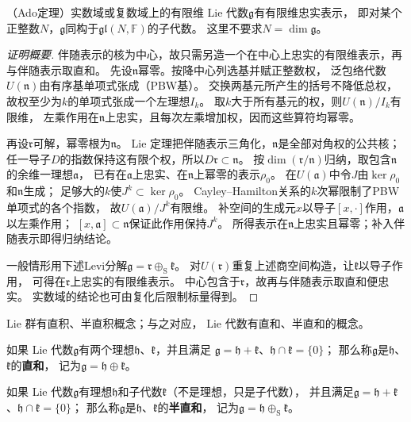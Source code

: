 \begin{theorem}
    （Ado定理）实数域或复数域上的有限维 Lie 代数$\mathfrak g$有有限维忠实表示，
    即对某个正整数$N$，$\mathfrak g$同构于$\mathfrak{gl}(N,\mathbb F)$的子代数。
    这里不要求$N=\dim\mathfrak g$。
\end{theorem}
\begin{proof}[证明概要]
伴随表示的核为中心，故只需另造一个在中心上忠实的有限维表示，再与伴随表示取直和。
先设$\mathfrak n$幂零。按降中心列选基并赋正整数权，
泛包络代数$U(\mathfrak n)$由有序基单项式张成（PBW基）。
交换两基元所产生的括号不降低总权，故权至少为$k$的单项式张成一个左理想$I_k$。
取$k$大于所有基元的权，则$U(\mathfrak n)/I_k$有限维，
左乘作用在$\mathfrak n$上忠实，且每次左乘增加权，因而这些算符均幂零。

再设$\mathfrak r$可解，幂零根为$\mathfrak n$。
Lie 定理把伴随表示三角化，$\mathfrak n$是全部对角权的公共核；
任一导子$D$的指数保持这有限个权，所以$D\mathfrak r\subset\mathfrak n$。
按$\dim(\mathfrak r/\mathfrak n)$归纳，取包含$\mathfrak n$的余维一理想$\mathfrak a$，
已有在$\mathfrak a$上忠实、在$\mathfrak n$上幂零的表示$\rho_0$。
在$U(\mathfrak a)$中令$J$由$\ker\rho_0$和$\mathfrak n$生成；
足够大的$k$使$J^k\subset\ker\rho_0$。
Cayley--Hamilton关系的$k$次幂限制了PBW单项式的各个指数，
故$U(\mathfrak a)/J^k$有限维。
补空间的生成元$x$以导子$[x,\cdot]$作用，$\mathfrak a$以左乘作用；
$[x,\mathfrak a]\subset\mathfrak n$保证此作用保持$J^k$。
所得表示在$\mathfrak n$上忠实且幂零；补入伴随表示即得归纳结论。

一般情形用下述Levi分解$\mathfrak g=\mathfrak r\oplus_{\mathrm S}\mathfrak k$。
对$U(\mathfrak r)$重复上述商空间构造，让$\mathfrak k$以导子作用，
可得在$\mathfrak r$上忠实的有限维表示。
中心包含于$\mathfrak r$，故再与伴随表示取直和便忠实。
实数域的结论也可由复化后限制标量得到。
\end{proof}

 Lie 群有直积、半直积概念；与之对应， Lie 代数有直和、半直和的概念。

\begin{definition}
    如果 Lie 代数$\mathfrak{g}$有两个理想$\mathfrak{h}$、$\mathfrak{k}$，并且满足
    $\mathfrak{g}=\mathfrak{h}+\mathfrak{k}$、$\mathfrak{h}\cap\mathfrak{k}=\{0\}$；
    那么称$\mathfrak{g}$是$\mathfrak{h}$、$\mathfrak{k}$的\textbf{直和}，
    记为$\mathfrak{g}=\mathfrak{h}\oplus\mathfrak{k}$。
\end{definition}

\begin{definition}
    如果 Lie 代数$\mathfrak{g}$有理想$\mathfrak{h}$和子代数$\mathfrak{k}$（不是理想，只是子代数），
    并且满足$\mathfrak{g}=\mathfrak{h}+\mathfrak{k}$、$\mathfrak{h}\cap\mathfrak{k}=\{0\}$；
    那么称$\mathfrak{g}$是$\mathfrak{h}$、$\mathfrak{k}$的\textbf{半直和}，
    记为$\mathfrak{g}=\mathfrak{h}\oplus_{\mathrm S}\mathfrak{k}$。
\end{definition}

